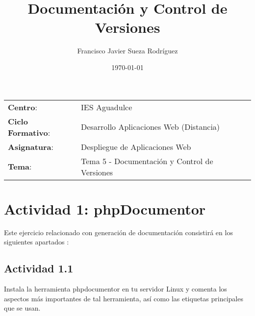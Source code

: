 


\title{
\vspace{10ex}
\normalfont \normalsize
\huge \textbf{Documentación y Control de Versiones}
}
\author{Francisco Javier Sueza Rodríguez}
\date{\normalsize\today}




\maketitle

\thispagestyle{empty}

\vspace{65ex}

\begin{center}
    \begin{tabular}{l l}
        \textbf{Centro}: & IES Aguadulce \\
        \textbf{Ciclo Formativo}: & Desarrollo Aplicaciones Web (Distancia)\\
        \textbf{Asignatura}: & Despliegue de Aplicaciones Web\\
        \textbf{Tema}: & Tema 5 - Documentación y Control de Versiones\\
    \end{tabular}
\end{center}

\newpage

\tableofcontents

\newpage

\section{Actividad 1: phpDocumentor}
Este ejercicio relacionado con generación de documentación consistirá en los siguientes apartados :

\subsection{Actividad 1.1}
Instala la herramienta phpdocumentor en tu servidor Linux y comenta los aspectos más importantes de tal herramienta, así como las etiquetas principales que se usan.

